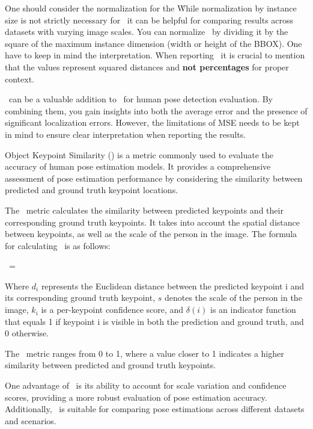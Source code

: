 One should consider the normalization for the \MSE\. While normalization by instance size is not strictly necessary for \MSE\, it can be helpful for comparing results across datasets with varying image scales. You can normalize \MSE\ by dividing it by the square of the maximum instance dimension (width or height of the BBOX).
One have to keep in mind the interpretation. When reporting \MSE\, it is crucial to mention that the values represent squared distances and {\bf not percentages} for proper context.

\MSE\ can be a valuable addition to \APE\ for human pose detection evaluation. By combining them, you gain insights into both the average error and the presence of significant localization errors. However, the limitations of MSE needs to be kept in mind to ensure clear interpretation when reporting the results.

Object Keypoint Similarity (\OKS) is a metric commonly used to evaluate the accuracy of human pose estimation models. It provides a comprehensive assessment of pose estimation performance by considering the similarity between predicted and ground truth keypoint locations.

The \OKS\ metric calculates the similarity between predicted keypoints and their corresponding ground truth keypoints. It takes into account the spatial distance between keypoints, as well as the scale of the person in the image. The formula for calculating \OKS\ is as follows:

\startplaceformula[reference=oks]
    \startformula \OKS\ = 
    \stopformula
\stopplaceformula

Where $ d_i $ represents the Euclidean distance between the predicted keypoint i and its corresponding ground truth keypoint, $ s $ denotes the scale of the person in the image, $ k_i $ is a per-keypoint confidence score, and $ \delta(i) $ is an indicator function that equals 1 if keypoint i is visible in both the prediction and ground truth, and 0 otherwise.

The \OKS\ metric ranges from 0 to 1, where a value closer to 1 indicates a higher similarity between predicted and ground truth keypoints.

One advantage of \OKS\ is its ability to account for scale variation and confidence scores, providing a more robust evaluation of pose estimation accuracy. Additionally, \OKS\ is suitable for comparing pose estimations across different datasets and scenarios.

